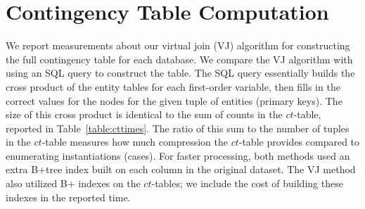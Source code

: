 \documentclass{vldb}
\newcommand{\ct}{\mathit{ct}}
\begin{document}
\begin{table} \centering
\caption{Constructing the full contingency table for each database. Computation times are given in seconds. M = million. N.T. = nontermination.
  \label{table:cttimes}}
\end{table}


\section{Contingency Table Computation}

We report measurements about our virtual join (VJ) algorithm for constructing the full contingency table for each database. We compare the VJ algorithm with using an SQL query to construct the table. The SQL query essentially builds the cross product of the entity tables for each first-order variable, then fills in the correct values for the nodes for the given tuple of entities (primary keys).  The size of this cross product is identical to the sum of counts in the $\ct$-table, reported in Table~\ref{table:cttimes}. The ratio of this sum to the number of tuples in the $\ct$-table measures how much compression the $\ct$-table provides compared to enumerating instantiations (cases). For faster processing, both methods used an extra B+tree index built on each column in the original dataset. The VJ method also utilized B+ indexes on the $\ct$-tables; we include the cost of building these indexes in the reported time. %
\end{document}

